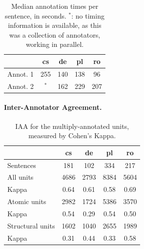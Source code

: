 \documentclass[11pt,letterpaper]{article}
\newcommand{\XXX}[1]{{\color{red}XXX #1}} %
\newcommand{\oa}[1]{}
\begin{document}

\begin{table}[t]
\begin{center}
{\small
\begin{tabular}{l|cccc}
& cs & de & pl & ro \\
\hline
Annot. 1 & 255 & 140  & 138 & 96 \\
Annot. 2 & $^*$ & 162 & 229 & 207 \\
\end{tabular}
\caption{Median annotation times per sentence, in seconds.
  $^*$: no timing information is available, as
  this was a collection of annotators, working in parallel.}
\label{tab:annot_times}
}
\end{center}
\end{table}




\paragraph{Inter-Annotator Agreement.}
\label{sec:iaa}

\begin{table}[t]
\begin{center}
{\small
\begin{tabular}{l|cccc}
 & cs & de & pl & ro \\
\hline
Sentences & 181 & 102 & 334 & 217 \\
\hline
All units & 4686   & 2793   & 8384   & 5604  \\
Kappa & 0.64   & 0.61   & 0.58   & 0.69  \\
\hline
Atomic units & 2982 & 1724 & 5386 & 3570 \\
Kappa & 0.54 & 0.29 & 0.54 & 0.50 \\
\hline
Structural units & 1602 & 1040 & 2655 & 1989 \\
Kappa & 0.31 & 0.44 & 0.33 & 0.58 \\
\end{tabular}
\caption{IAA for the multiply-annotated units,
measured by Cohen's Kappa. }
\label{tab:iaa}
}
\end{center}
\end{table}

\end{document}
